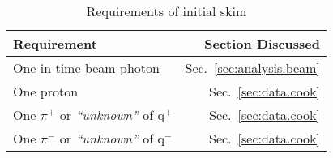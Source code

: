 \begin{table}[h!]
\begin{minipage}{\textwidth}
\begin{center}
\begin{singlespacing}
\caption[Skim requirements]{\label{tab:skim.requirements}Requirements of initial skim \vspace{0.75mm}} %

\begin{tabular}{lr}

\hline
Requirement & \quad \quad Section Discussed \\
\hline
One in-time beam photon &  Sec.~\ref{sec:analysis.beam} \\ 
One proton & Sec.~\ref{sec:data.cook} \\
One $\pi^+$ or \emph{``unknown''} of q$^+$ & Sec.~\ref{sec:data.cook} \\
One $\pi^-$ or \emph{``unknown''} of q$^-$ & Sec.~\ref{sec:data.cook} \\
\hline \hline
\end{tabular}

\end{singlespacing}
\end{center}
\end{minipage}
\end{table}
\vspace{20pt}